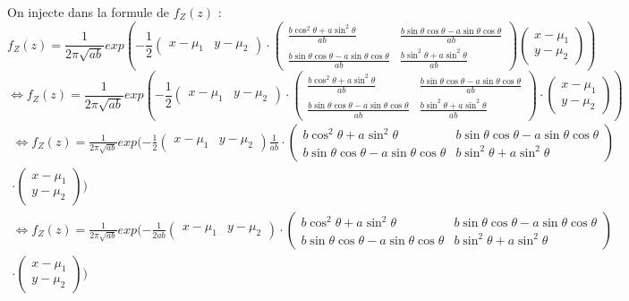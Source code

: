 \documentclass{article}
\begin{document}
On injecte dans la formule de $f_Z(z)$ :
$$f_Z(z) = \frac{1}{2\pi \sqrt{ab}}exp(-\frac{1}{2}\begin{pmatrix}x-\mu_1 & y-\mu_2 \end{pmatrix}\cdot\begin{pmatrix} \frac{b\cos^{2} \theta + a\sin^{2} \theta}{ab} & \frac{b\sin \theta\cos \theta - a\sin \theta\cos \theta}{ab} \\ \frac{b\sin \theta\cos \theta - a\sin \theta\cos \theta}{ab} & \frac{b\sin^{2} \theta + a\sin^{2} \theta}{ab}\end{pmatrix}\begin{pmatrix}x-\mu_1 \\ y-\mu_2 \end{pmatrix})$$
$$ \Leftrightarrow f_Z(z) = \frac{1}{2\pi \sqrt{ab}}exp(-\frac{1}{2}\begin{pmatrix}x-\mu_1 & y-\mu_2 \end{pmatrix}\cdot\begin{pmatrix} \frac{b\cos^{2} \theta + a\sin^{2} \theta}{ab} & \frac{b\sin \theta\cos \theta - a\sin \theta\cos \theta}{ab} \\ \frac{b\sin \theta\cos \theta - a\sin \theta\cos \theta}{ab} & \frac{b\sin^{2} \theta + a\sin^{2} \theta}{ab}\end{pmatrix}\cdot\begin{pmatrix}x-\mu_1 \\ y-\mu_2 \end{pmatrix})$$
\begin{multline*} \Leftrightarrow f_Z(z) = \frac{1}{2\pi \sqrt{ab}}exp(-\frac{1}{2}\begin{pmatrix}x-\mu_1 & y-\mu_2 \end{pmatrix}\frac{1}{ab}\cdot\begin{pmatrix} b\cos^{2} \theta + a\sin^{2} \theta & b\sin \theta\cos \theta - a\sin \theta\cos \theta \\ b\sin \theta\cos \theta - a\sin \theta\cos \theta & b\sin^{2} \theta + a\sin^{2} \theta\end{pmatrix}\\\cdot\begin{pmatrix}x-\mu_1 \\ y-\mu_2 \end{pmatrix})\end{multline*}
\begin{multline*}\Leftrightarrow f_Z(z) = \frac{1}{2\pi \sqrt{ab}}exp(-\frac{1}{2ab}\begin{pmatrix}x-\mu_1 & y-\mu_2 \end{pmatrix}\cdot\begin{pmatrix} b\cos^{2} \theta + a\sin^{2} \theta & b\sin \theta\cos \theta - a\sin \theta\cos \theta \\ b\sin \theta\cos \theta - a\sin \theta\cos \theta & b\sin^{2} \theta + a\sin^{2} \theta\end{pmatrix}\\\cdot \begin{pmatrix}x-\mu_1 \\ y-\mu_2 \end{pmatrix})\end{multline*}
\end{document}
